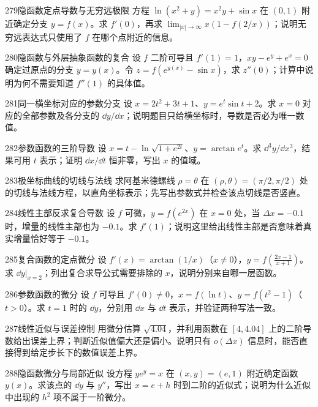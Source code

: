 \begin{exercise}{279}{隐函数定点导数与无穷远极限}
方程 $\ln(x^2+y)=x^2y+\sin x$ 在 $(0,1)$ 附近确定分支 $y=f(x)$。求 $f'(0)$，再求 $\lim_{|x|\to\infty}x\left(1-f(2/x)\right)$；说明无穷远表达式只使用了 $f$ 在哪个点附近的信息。
\end{exercise}
\begin{exercise}{280}{隐函数与外层抽象函数的复合}
设 $f$ 二阶可导且 $f'(1)=1$，$xy-e^y+e^x=0$ 确定过原点的分支 $y=y(x)$。令 $z=f(e^{y(x)}-\sin x)$，求 $z''(0)$；计算中说明为何不需要知道 $f''(1)$ 的具体值。
\end{exercise}
\begin{exercise}{281}{同一横坐标对应的参数分支}
设 $x=2t^2+3t+1$、$y=e^t\sin t+2$。求 $x=0$ 对应的全部参数及各分支的 $\dd y/\dd x$；说明题目只给横坐标时，导数是否必为唯一数值。
\end{exercise}
\begin{exercise}{282}{参数函数的三阶导数}
设 $x=t-\ln\sqrt{1+e^{2t}}$、$y=\arctan e^t$。求 $\dd^3y/\dd x^3$，结果可用 $t$ 表示；证明 $\dd x/\dd t$ 恒非零，写出 $x$ 的值域。
\end{exercise}
\begin{exercise}{283}{极坐标曲线的切线与法线}
求阿基米德螺线 $\rho=\theta$ 在 $(\rho,\theta)=(\pi/2,\pi/2)$ 处的切线与法线方程，以直角坐标表示；先写出参数式并检查该点切线是否竖直。
\end{exercise}
\begin{exercise}{284}{线性主部反求复合导数}
设 $f$ 可微，$y=f(e^{2x})$ 在 $x=0$ 处，当 $\Delta x=-0.1$ 时，增量的线性主部也为 $-0.1$。求 $f'(1)$；说明这里给出线性主部是否意味着真实增量恰好等于 $-0.1$。
\end{exercise}
\begin{exercise}{285}{复合函数的定点微分}
设 $f'(x)=\arctan(1/x)$（$x\ne0$），$y=f\left(\frac{2x-1}{x+1}\right)$。求 $\dd y|_{x=2}$；列出复合求导公式需要排除的 $x$，说明分别来自哪一层函数。
\end{exercise}
\begin{exercise}{286}{参数函数的微分}
设 $f$ 可导且 $f'(0)\ne0$，$x=f(\ln t)$、$y=f(t^2-1)$（$t>0$）。求 $t=1$ 时的 $\dd y$，分别用 $\dd x$ 与 $\dd t$ 表示，并验证两种写法一致。
\end{exercise}
\begin{exercise}{287}{线性近似与误差控制}
用微分估算 $\sqrt{4.04}$，并利用函数在 $[4,4.04]$ 上的二阶导数给出误差上界；判断近似值偏大还是偏小。说明只有 $o(\Delta x)$ 信息时，能否直接得到给定步长下的数值误差上界。
\end{exercise}
\begin{exercise}{288}{隐函数微分与局部近似}
设方程 $ye^y=x$ 在 $(x,y)=(e,1)$ 附近确定函数 $y(x)$。求该点的 $\dd y$ 与 $y''$，写出 $x=e+h$ 时到二阶的近似式；说明为什么近似中出现的 $h^2$ 项不属于一阶微分。
\end{exercise}
